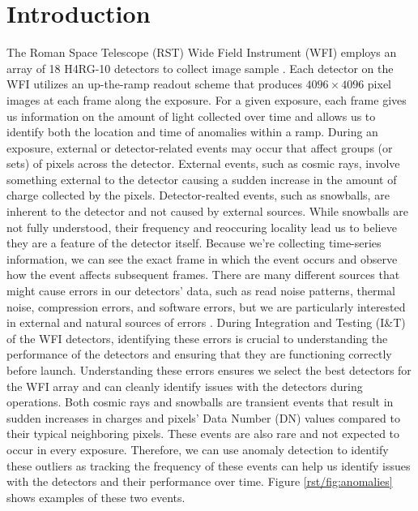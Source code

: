 \section{Introduction}
The Roman Space Telescope (RST) Wide Field Instrument (WFI) employs an array of 18 H4RG-10 detectors to collect image sample \parencite{Mosby_2020}.
Each detector on the WFI utilizes an up-the-ramp readout scheme that produces $4096 \times 4096$ pixel images at each frame along the exposure. 
For a given exposure, each frame gives us information on the amount of light collected over time and allows us to identify both the location and time of anomalies within a ramp.
During an exposure, external or detector-related events may occur that affect groups (or sets) of pixels across the detector. 
External events, such as cosmic rays, involve something external to the detector causing a sudden increase in the amount of charge collected by the pixels.
Detector-realted events, such as snowballs, are inherent to the detector and not caused by external sources.
While snowballs are not fully understood, their frequency and reoccuring locality lead us to believe they are a feature of the detector itself.
Because we're collecting time-series information, we can see the exact frame in which the event occurs and observe how the event affects subsequent frames. 
There are many different sources that might cause errors in our detectors' data, such as read noise patterns, thermal noise, compression errors, and software errors, but we are particularly interested in external and natural sources of errors \parencite{cillis2018snowballs}. 
During Integration and Testing (I&T) of the WFI detectors, identifying these errors is crucial to understanding the performance of the detectors and ensuring that they are functioning correctly before launch.
Understanding these errors ensures we select the best detectors for the WFI array and can cleanly identify issues with the detectors during operations.
Both cosmic rays and snowballs are transient events that result in sudden increases in charges and pixels' Data Number (DN) values compared to their typical neighboring pixels.
These events are also rare and not expected to occur in every exposure.
Therefore, we can use anomaly detection to identify these outliers as tracking the frequency of these events can help us identify issues with the detectors and their performance over time.
Figure \ref{rst/fig:anomalies} shows examples of these two events.


